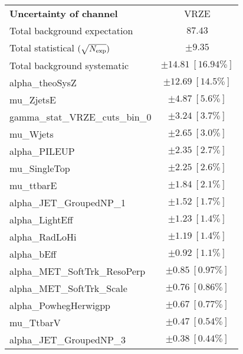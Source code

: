 
\begin{table}
\begin{center}
\setlength{\tabcolsep}{0.0pc}
\begin{tabular*}{\textwidth}{@{\extracolsep{\fill}}lc}
\noalign{\smallskip}\hline\noalign{\smallskip}
{\bf Uncertainty of channel}                                    & VRZE            \\
\noalign{\smallskip}\hline\noalign{\smallskip}
Total background expectation             &  $87.43$       \\
\noalign{\smallskip}\hline\noalign{\smallskip}
Total statistical $(\sqrt{N_{\rm exp}})$              & $\pm 9.35$       \\
Total background systematic               & $\pm 14.81\ [16.94\%] $             \\
\noalign{\smallskip}\hline\noalign{\smallskip}
\noalign{\smallskip}\hline\noalign{\smallskip}
alpha\_theoSysZ         & $\pm 12.69\ [14.5\%] $       \\
mu\_ZjetsE         & $\pm 4.87\ [5.6\%] $       \\
gamma\_stat\_VRZE\_cuts\_bin\_0         & $\pm 3.24\ [3.7\%] $       \\
mu\_Wjets         & $\pm 2.65\ [3.0\%] $       \\
alpha\_PILEUP         & $\pm 2.35\ [2.7\%] $       \\
mu\_SingleTop         & $\pm 2.25\ [2.6\%] $       \\
mu\_ttbarE         & $\pm 1.84\ [2.1\%] $       \\
alpha\_JET\_GroupedNP\_1         & $\pm 1.52\ [1.7\%] $       \\
alpha\_LightEff         & $\pm 1.23\ [1.4\%] $       \\
alpha\_RadLoHi         & $\pm 1.19\ [1.4\%] $       \\
alpha\_bEff         & $\pm 0.92\ [1.1\%] $       \\
alpha\_MET\_SoftTrk\_ResoPerp         & $\pm 0.85\ [0.97\%] $       \\
alpha\_MET\_SoftTrk\_Scale         & $\pm 0.76\ [0.86\%] $       \\
alpha\_PowhegHerwigpp         & $\pm 0.67\ [0.77\%] $       \\
mu\_TtbarV         & $\pm 0.47\ [0.54\%] $       \\
alpha\_JET\_GroupedNP\_3         & $\pm 0.38\ [0.44\%] $       \\

\end{tabular*}
\end{center}
\end{table}
